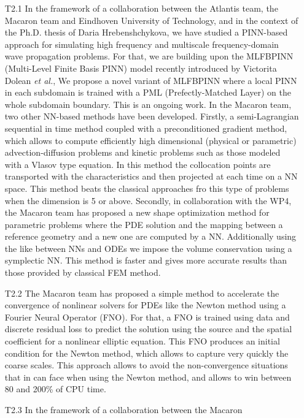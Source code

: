 \begin{itemize}
\item[T2.1] In the  framework of a collaboration  between the Atlantis
  team, the Macaron team and Eindhoven  University of  Technology,  and in
  the context of  the Ph.D.  thesis of Daria  Hrebenshchykova, we have
  studied  a PINN-based  approach  for simulating  high frequency  and
  multiscale frequency-domain wave propagation  problems. For that, we
  are building upon the MLFBPINN (Multi-Level Finite Basis PINN) model
  recently introduced by  Victorita Dolean {\em et al.},  We propose a
  novel variant  of MLFBPINN where a  local PINN in each  subdomain is
  trained with a PML (Prefectly-Matched  Layer) on the whole subdomain
  boundary.  This  is an ongoing  work. In the Macaron  team,  two  other
  NN-based methods  have been  developed. Firstly, a semi-Lagrangian
  sequential  in time  method coupled  with a  preconditioned gradient
  method,  which  allows  to   compute  efficiently  high  dimensional
  (physical  or parametric)  advection-diffusion problems  and kinetic
  problems such as those modeled with a Vlasov type equation. In this
  method   the   collocation   points   are   transported   with   the
  characteristics and then projected at each time on a NN space.  This
  method beats the classical approaches fro this type of problems when
  the dimension is 5 or above.  Secondly, in collaboration with the WP4,  the Macaron  team has  proposed a  new shape  optimization
  method  for  parametric problems  where  the  PDE solution  and  the
  mapping between a reference geometry and a new one are computed by a
  NN.  Additionally using the like between  NNs and ODEs we impose the
  volume conservation  using a symplectic NN.  This method  is faster
  and gives more accurate results than those provided by classical FEM
  method.
\item[T2.2]  The Macaron  team has proposed  a simple method  to accelerate
  the convergence of nonlinear solvers for PDEs like the Newton method
  using a Fourier  Neural Operator (FNO).  For that, a  FNO is trained
  using data and discrete residual  loss to predict the solution using
  the  source and  the spatial  coefficient for  a nonlinear  elliptic
  equation.  This  FNO produces  an initial  condition for  the Newton
  method,  which allows  to capture  very quickly  the coarse  scales.
  This approach allows to avoid the non-convergence situations that in
  can face when using the Newton  method, and allows to win between 80
  and 200\% of CPU time.
\item[T2.3] In  the framework of  a collaboration between  the Macaron

\end{itemize}
